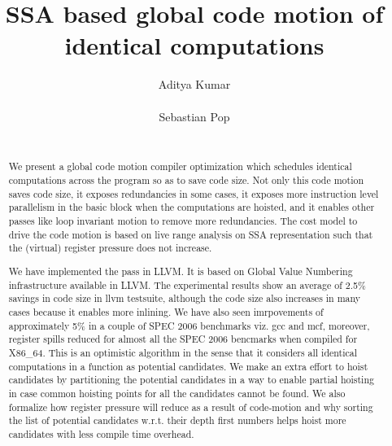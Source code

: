 \documentclass{sig-alternate}
\begin{document}
\def \GCC {GCC}
\def \LLVM {LLVM}
\def \SESE {SESE}
\def \CFG {CFG}
\def \SSA {SSA}
\def \MemorySSA {MemorySSA}
\def \PRE {PRE}
\def \GVN {GVN}
\def \LLVMTestSuite {\LLVM{} test-suite}

\setlength{\pdfpageheight}{\paperheight}
\setlength{\pdfpagewidth}{\paperwidth}

\title{SSA based global code motion of identical computations}

\toappear{
   \hrule \vspace{5pt}
   \LLVM{}-dev 2016
}

\author{
\alignauthor
Aditya Kumar\\
       \\
\alignauthor
Sebastian Pop\\
       \\
}

\maketitle
\begin{abstract}
We present a global code motion compiler optimization which schedules
identical computations across the program so as to save code size.  Not only
this code motion saves code size, it exposes redundancies in some cases, it
exposes more instruction level parallelism in the basic block when the
computations are hoisted, and it enables other passes like loop invariant
motion to remove more redundancies. The cost model to drive the code motion is
based on live range analysis on SSA representation such that the (virtual)
register pressure does not increase.

We have implemented the pass in \LLVM{}. It is based on Global Value Numbering
infrastructure available in \LLVM{}. The experimental results show an average
of 2.5\% savings in code size in llvm testsuite, although the code size also
increases in many cases because it enables more inlining. We have also seen
imrpovements of approximately 5\% in a couple of SPEC 2006 benchmarks viz. gcc
and mcf, moreover, register spills reduced for almost all the SPEC 2006
bencmarks when compiled for X86\_64. This is an optimistic algorithm in the
sense that it considers all identical computations in a function as potential
candidates. We make an extra effort to hoist candidates by partitioning the
potential candidates in a way to enable partial hoisting in case common
hoisting points for all the candidates cannot be found. We also formalize how
register pressure will reduce as a result of code-motion and why sorting the
list of potential candidates w.r.t. their depth first numbers helps hoist more
candidates with less compile time overhead.
\end{abstract}
\end{document}
